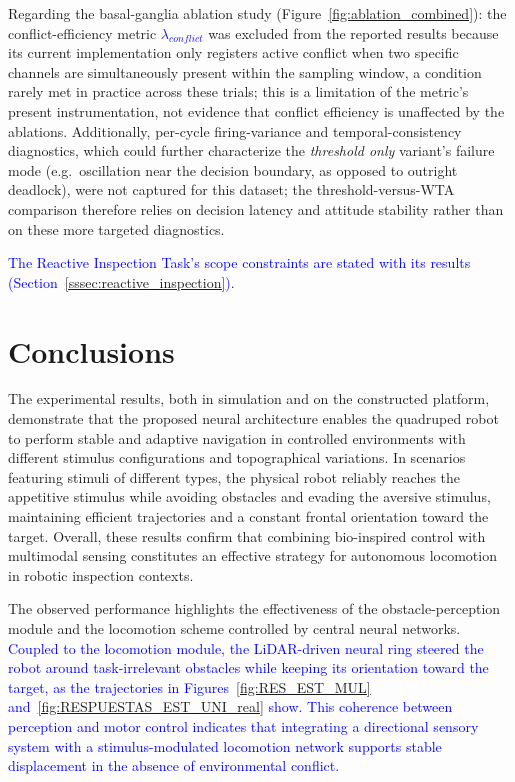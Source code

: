 \documentclass[preprint,12pt]{elsarticle}
\newcommand{\revblue}[1]{\textcolor{blue}{#1}}
\begin{document}
Regarding the basal-ganglia ablation study (Figure~\ref{fig:ablation_combined}): the conflict-efficiency metric \revblue{$\lambda_{conflict}$} was excluded from the reported results because its current implementation only registers active conflict when two specific channels are simultaneously present within the sampling window, a condition rarely met in practice across these trials; this is a limitation of the metric's present instrumentation, not evidence that conflict efficiency is unaffected by the ablations. Additionally, per-cycle firing-variance and temporal-consistency diagnostics, which could further characterize the \emph{threshold only} variant's failure mode (e.g.\ oscillation near the decision boundary, as opposed to outright deadlock), were not captured for this dataset; the threshold-versus-WTA comparison therefore relies on decision latency and attitude stability rather than on these more targeted diagnostics.

\revblue{The Reactive Inspection Task's scope constraints are stated with its results (Section~\ref{sssec:reactive_inspection}).}

\section{Conclusions}
\label{sec:conclusions}

The experimental results, both in simulation and on the constructed platform, demonstrate that the proposed neural architecture enables the quadruped robot to perform stable and adaptive navigation in controlled environments with different stimulus configurations and topographical variations. In scenarios featuring stimuli of different types, the physical robot reliably reaches the appetitive stimulus while avoiding obstacles and evading the aversive stimulus, maintaining efficient trajectories and a constant frontal orientation toward the target. Overall, these results confirm that combining bio-inspired control with multimodal sensing constitutes an effective strategy for autonomous locomotion in robotic inspection contexts. 

The observed performance highlights the effectiveness of the obstacle-perception module and the locomotion scheme controlled by central neural networks. \revblue{Coupled to the locomotion module, the LiDAR-driven neural ring steered the robot around task-irrelevant obstacles while keeping its orientation toward the target, as the trajectories in Figures~\ref{fig:RES_EST_MUL} and~\ref{fig:RESPUESTAS_EST_UNI_real} show. This coherence between perception and motor control indicates that integrating a directional sensory system with a stimulus-modulated locomotion network supports stable displacement in the absence of environmental conflict.} 
\end{document}
